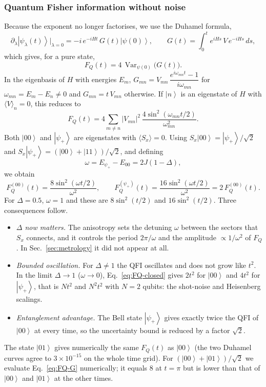 \documentclass[11pt,a4paper]{article}
\newcommand{\ket}[1]{\left|#1\right\rangle}
\newcommand{\Var}{\operatorname{Var}}
\newcommand{\FQ}{F_Q}
\begin{document}
\subsubsection{Quantum Fisher information without noise}
Because the exponent no longer factorises, we use the Duhamel formula,
\begin{equation}
  \partial_\lambda\ket{\psi_\lambda(t)}\Big|_{\lambda=0}=-i\,e^{-iHt}\,G(t)\ket{\psi(0)},\qquad G(t)=\int_0^t e^{iHs}\,V\,e^{-iHs}\,ds,
\end{equation}
which gives, for a pure state,
\begin{equation}
  \FQ(t)=4\,\Var_{\psi(0)}\bigl(G(t)\bigr).
  \label{eq:FQ-G}
\end{equation}
In the eigenbasis of $H$ with energies $E_m$, $G_{mn}=V_{mn}\,\dfrac{e^{i\omega_{mn}t}-1}{i\omega_{mn}}$ for $\omega_{mn}=E_m-E_n\neq0$ and $G_{mn}=t\,V_{mn}$ otherwise. If $\ket n$ is an eigenstate of $H$ with $\langle V\rangle_n=0$, this reduces to
\begin{equation}
  \FQ(t)=4\sum_{m\neq n}\lvert V_{mn}\rvert^2\,\frac{4\sin^2(\omega_{mn}t/2)}{\omega_{mn}^2}.
\end{equation}
Both $\ket{00}$ and $\ket{\psi_+}$ are eigenstates with $\langle S_x\rangle=0$. Using $S_x\ket{00}=\ket{\psi_+}/\sqrt2$ and $S_x\ket{\psi_+}=(\ket{00}+\ket{11})/\sqrt2$, and defining
\begin{equation}
  \omega=E_{\psi_+}-E_{00}=2J(1-\Delta),
\end{equation}
we obtain
\begin{equation}
  \FQ^{(00)}(t)=\frac{8\sin^2(\omega t/2)}{\omega^2},\qquad
  \FQ^{(\psi_+)}(t)=\frac{16\sin^2(\omega t/2)}{\omega^2}=2\,\FQ^{(00)}(t).
  \label{eq:FQ-closed}
\end{equation}
For $\Delta=0.5$, $\omega=1$ and these are $8\sin^2(t/2)$ and $16\sin^2(t/2)$. Three consequences follow.
\begin{itemize}
  \item \emph{$\Delta$ now matters.} The anisotropy sets the detuning $\omega$ between the sectors that $S_x$ connects, and it controls the period $2\pi/\omega$ and the amplitude $\propto1/\omega^2$ of $\FQ$. In Sec.~\ref{sec:metrology} it did not appear at all.
  \item \emph{Bounded oscillation.} For $\Delta\neq1$ the QFI oscillates and does not grow like $t^2$. In the limit $\Delta\to1$ ($\omega\to0$), Eq.~\eqref{eq:FQ-closed} gives $2t^2$ for $\ket{00}$ and $4t^2$ for $\ket{\psi_+}$, that is $Nt^2$ and $N^2t^2$ with $N=2$ qubits: the shot-noise and Heisenberg scalings.
  \item \emph{Entanglement advantage.} The Bell state $\ket{\psi_+}$ gives exactly twice the QFI of $\ket{00}$ at every time, so the uncertainty bound is reduced by a factor $\sqrt2$.
\end{itemize}
The state $\ket{01}$ gives numerically the same $\FQ(t)$ as $\ket{00}$ (the two Duhamel curves agree to $3\times10^{-15}$ on the whole time grid). For $(\ket{00}+\ket{01})/\sqrt2$ we evaluate Eq.~\eqref{eq:FQ-G} numerically; it equals $8$ at $t=\pi$ but is lower than that of $\ket{00}$ and $\ket{01}$ at the other times.
\end{document}
